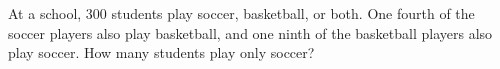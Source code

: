 At a school, $300$ students play soccer, basketball, or both. One fourth of the soccer players also play basketball, and one ninth of the basketball players also play soccer. How many students play only soccer?
